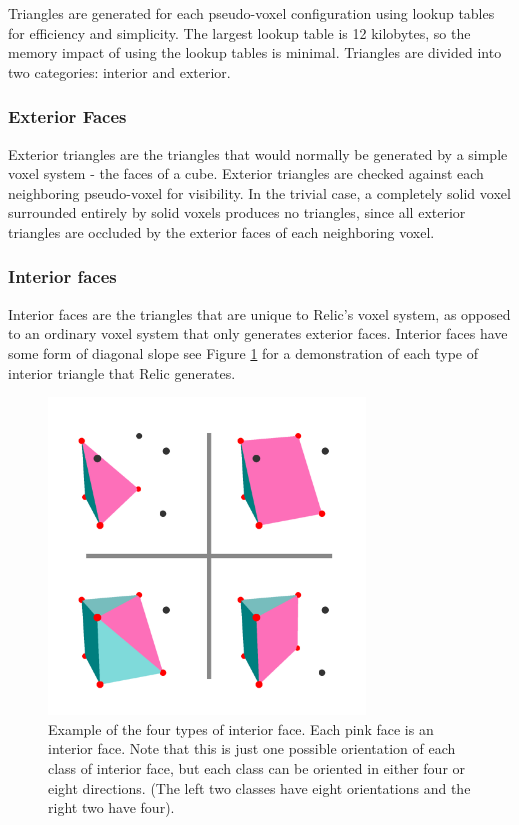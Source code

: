 Triangles are generated for each pseudo-voxel configuration using lookup tables for efficiency and simplicity.
The largest lookup table is 12 kilobytes, so the memory impact of using the lookup tables is minimal.
Triangles are divided into two categories: interior and exterior.

\subsubsection{Exterior Faces}

Exterior triangles are the triangles that would normally be generated by a simple voxel system - the faces of a cube.
Exterior triangles are checked against each neighboring pseudo-voxel for visibility.
In the trivial case, a completely solid voxel surrounded entirely by solid voxels produces no triangles, since all exterior triangles are occluded by the exterior faces of each neighboring voxel.

\subsubsection{Interior faces}

Interior faces are the triangles that are unique to Relic's voxel system, as opposed to an ordinary voxel system that only generates exterior faces.
Interior faces have some form of diagonal slope see Figure \ref{fig:interiorfaces2} for a demonstration of each type of interior triangle that Relic generates.

\begin{figure}
	\centering
		\includegraphics[width=0.75\textwidth]{figures/interiorfaces2.png}
	\caption{
		Example of the four types of interior face.
		Each pink face is an interior face.
		Note that this is just one possible orientation of each class of interior face, but each class can be oriented in either four or eight directions.
		(The left two classes have eight orientations and the right two have four).
	}
	\label{fig:interiorfaces2}
\end{figure}

